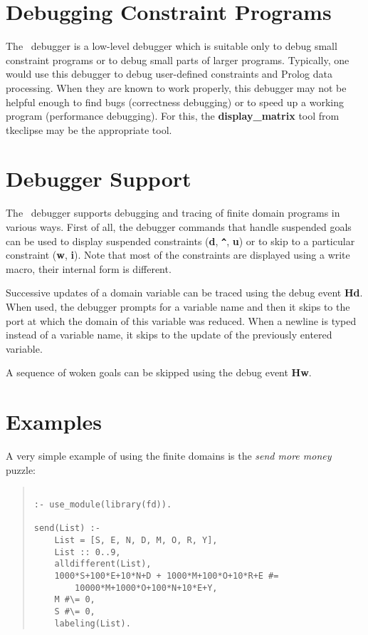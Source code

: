 \section{Debugging Constraint Programs}
The \eclipse\ debugger is a low-level debugger which is
suitable only to debug small constraint programs or to debug
small parts of larger programs. Typically, one would use this debugger
to debug user-defined constraints and Prolog data processing.
When they are known to work properly, this debugger may
not be helpful enough to find bugs (correctness debugging) or to speed up 
a working program (performance debugging).
For this, the {\bf display_matrix} tool from tkeclipse may be the
appropriate tool. 


\section{Debugger Support}
The \eclipse\ debugger supports
debugging and tracing of finite domain programs in various ways.
First of all, the debugger commands that handle suspended
goals can be used to display suspended constraints ({\bf d}, {\bf \verb+^+},
{\bf u}) or
to skip to a particular constraint ({\bf w}, {\bf i}).
Note that most of the constraints are displayed using a write macro,
their internal form is different. 

Successive updates of a domain variable can be traced using the
debug event {\bf Hd}.
When used, the debugger prompts for a variable name and then it
skips to the port at which the domain of this variable
was reduced.
When a newline is typed instead of a variable name, it skips
to the update of the previously entered variable.

A sequence of woken goals can be skipped using the debug event {\bf Hw}.

\section{Examples}
A very simple example of using the finite domains is the {\it send
more money} puzzle:
\begin{quote}
\begin{verbatim}

:- use_module(library(fd)).

send(List) :-
    List = [S, E, N, D, M, O, R, Y],
    List :: 0..9,
    alldifferent(List),
    1000*S+100*E+10*N+D + 1000*M+100*O+10*R+E #=
        10000*M+1000*O+100*N+10*E+Y,
    M #\= 0,
    S #\= 0,
    labeling(List).
\end{verbatim}
\end{quote}

